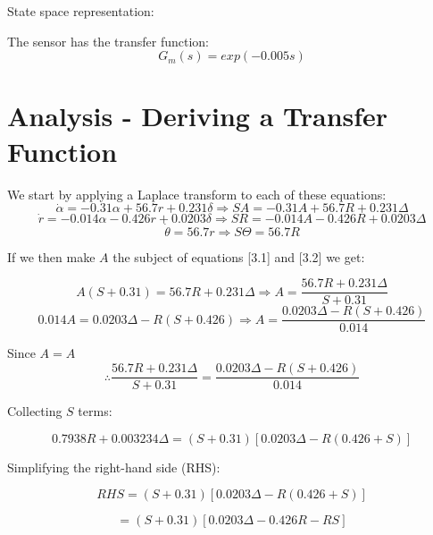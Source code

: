 \documentclass{article}
\numberwithin{equation}{section}
\begin{document}
State space representation:


The sensor has the transfer function:
\[G_m(s) = exp(-0.005s)\]
\newpage
\section{Analysis - Deriving a Transfer Function}
We start by applying a Laplace transform to each of these equations:
\begin{equation}
\dot{\alpha} = -0.31\alpha + 56.7r + 0.231\delta \Rightarrow SA = -0.31A + 56.7R + 0.231\Delta
\end{equation}
\begin{equation}
\dot{r} = -0.014\alpha - 0.426r +0.0203\delta \Rightarrow SR = -0.014A - 0.426R +0.0203\Delta
\end{equation}
\begin{equation}
\dot{\theta} = 56.7r \Rightarrow S\Theta = 56.7R
\end{equation}

If we then make \(A\) the subject of equations [3.1] and [3.2] we get:

\begin{equation}
A(S + 0.31) = 56.7R + 0.231 \Delta \Rightarrow A = \frac{56.7R + 0.231 \Delta}{S + 0.31}
\end{equation}
\begin{equation}
0.014A = 0.0203\Delta - R(S + 0.426) \Rightarrow A = \frac{0.0203\Delta - R(S + 0.426)}{0.014}
\end{equation}

Since \(A=A\)
\begin{equation}
\therefore \frac{56.7R + 0.231 \Delta}{S + 0.31} = \frac{0.0203\Delta - R(S + 0.426)}{0.014}
\end{equation}

Collecting \(S\) terms:

\begin{equation}
0.7938R + 0.003234 \Delta = (S + 0.31)[0.0203\Delta - R(0.426 + S)]
\end{equation}

Simplifying the right-hand side (RHS):

\begin{equation}
RHS = (S + 0.31)[0.0203\Delta - R(0.426 + S)]
\end{equation}

\begin{equation}
= (S + 0.31)[0.0203\Delta - 0.426R - RS]
\end{equation}
\end{document}
